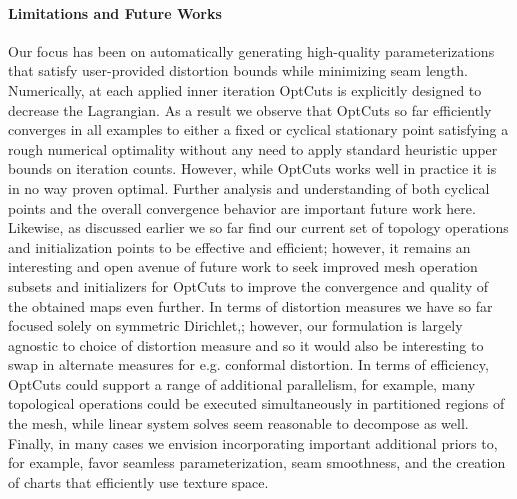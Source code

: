 \paragraph{Limitations and Future Works}
Our focus has been on automatically generating high-quality parameterizations that satisfy user-provided distortion bounds while minimizing seam length. Numerically, at each applied inner iteration OptCuts is explicitly designed to decrease the Lagrangian. As a result we observe that OptCuts so far efficiently converges in all examples to either a fixed or cyclical stationary point satisfying a rough numerical optimality without any need to apply standard heuristic upper bounds on iteration counts. However, while OptCuts works well in practice it is in no way proven optimal. Further analysis and understanding of both cyclical points and the overall convergence behavior are important future work here. Likewise, as discussed earlier we so far find our current set of topology operations and initialization points to be effective and efficient; however, it remains an interesting and open avenue of future work to seek improved mesh operation subsets and initializers for OptCuts to improve the convergence and quality of the obtained maps even further. In terms of distortion measures we have so far focused solely on symmetric Dirichlet,; however, our formulation is largely agnostic to choice of distortion measure and so it would also be interesting to swap in alternate measures for e.g. conformal distortion. In terms of efficiency, OptCuts could support a range 
of additional parallelism, for example, many topological operations could be executed simultaneously in partitioned regions of the mesh, while linear system solves seem reasonable to decompose as well. Finally, in many cases we envision incorporating important additional priors to, for example, favor seamless parameterization, seam smoothness, and the creation of charts that efficiently use texture space. 


%

